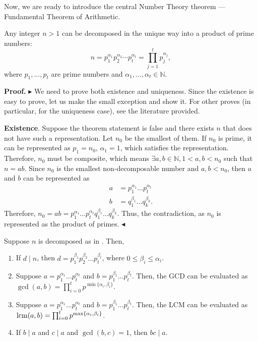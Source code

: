 \documentclass[../lecture-notes-148x210.tex]{subfiles}
\begin{document}
Now, we are ready to introduce the central Number Theory theorem --- Fundamental
Theorem of Arithmetic.

\begin{theorem}\label{th:fundamental_arithmetic}
    Any integer $n>1$ can be decomposed in the unique way into a product of prime numbers:
    \begin{equation*}
        n = p_1^{\alpha_1}p_2^{\alpha_2}\cdots p_t^{\alpha_t} = \prod_{j=1}^t p_j^{\alpha_j},
    \end{equation*}
    where $p_1,\dots,p_t$ are prime numbers and $\alpha_1,\dots,\alpha_t \in \mathbb{N}$.
\end{theorem}

\textbf{Proof.} 
$\blacktriangleright$  
We need to prove both existence and uniqueness. Since the existence is
easy to prove, let us make the small exception and show it. For other proves (in
particular, for the uniqueness case), see the literature provided.

\textcolor{green!60!black}{\textbf{Existence}}. Suppose the theorem statement is
false and there exists $n$ that does not have such a representation. Let $n_0$ be
the smallest of them. If $n_0$ is prime, it can be represented as $p_1=n_0$,
$\alpha_1=1$, which satisfies the representation. Therefore, $n_0$ must be
composite, which means $\exists a, b \in \mathbb{N}, 1 < a, b < n_0$ such that
$n = ab$. Since $n_0$ is the smallest non-decomposable number and $a, b < n_0$,
then $a$ and $b$ can be represented as 
\begin{align*}
    a &= p_{1}^{\alpha_{1}} \dots p_{t}^{\alpha_{t}} \\
    b &= q_{1}^{\beta_{1}} \dots q_{k}^{\beta_{k}}.
\end{align*}
Therefore, $n_0 = ab=p_{1}^{\alpha_{1}} \dots p_{t}^{\alpha_{t}}
q_{1}^{\beta_{1}} \dots q_{k}^{\beta_{k}}$. Thus, the contradiction, as $n_0$ is
represented as the product of primes. $\blacktriangleleft$  

\begin{corollary}
    Suppose $n$ is decomposed as in . Then,

    \begin{enumerate}
        \item If $d \mid n$, then $d = p_{1}^{\beta_1}p_{2}^{\beta_2} \dots p_{t}^{\beta_t}$, where $0 \leq \beta_i \leq \alpha_i$.
        \item Suppose $a = p_{1}^{\alpha_1} \dots p_{t}^{\alpha_t}$ and $b = p_{1}^{\beta_1} \dots p_{t}^{\beta_t}$. Then, the GCD can be evaluated as $\gcd(a, b) = \prod_{i=0}^{t}p^{\min\{\alpha_i, \beta_i\}}$.
        \item Suppose $a = p_{1}^{\alpha_1} \dots p_{t}^{\alpha_t}$ and $b = p_{1}^{\beta_1} \dots p_{t}^{\beta_t}$. Then, the LCM can be evaluated as $\text{lcm}(a, b) = \prod_{i=0}^{t}p^{\max\{\alpha_i, \beta_i\}}$.
        \item If $b \mid a$ and $c \mid a$ and $\gcd(b, c) = 1$, then $bc \mid a$.
    \end{enumerate}
\end{corollary}
\end{document}
